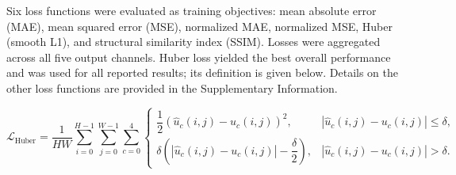 \documentclass[preprint,review,12pt,numafflabel]{elsarticle}
\begin{document}
Six loss functions were evaluated as training objectives: mean absolute error (MAE), mean squared error (MSE), normalized MAE, normalized MSE, Huber (smooth L1), and structural similarity index (SSIM). Losses were aggregated across all five output channels. Huber loss yielded the best overall performance and was used for all reported results; its definition is given below. Details on the other loss functions are provided in the Supplementary Information.


\begin{equation*}
\mathcal{L}_{\text{Huber}}
=
\frac{1}{HW}
\sum_{i=0}^{H-1}
\sum_{j=0}^{W-1}
\sum_{c=0}^{4}
\begin{cases}
\dfrac{1}{2}\left(\hat{u}_c(i,j)-u_c(i,j)\right)^2,
&
\left|\hat{u}_c(i,j)-u_c(i,j)\right|\le\delta,
\\[2ex]
\delta\left(
\left|\hat{u}_c(i,j)-u_c(i,j)\right|
-\dfrac{\delta}{2}
\right),
&
\left|\hat{u}_c(i,j)-u_c(i,j)\right|>\delta.
\end{cases}
\end{equation*}
\end{document}
